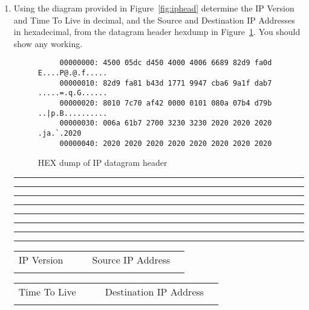\documentclass[a4paper,10pt]{article}
\begin{document}
\begin{enumerate}
\item Using the diagram provided in Figure~\ref{fig:iphead} determine
the IP Version and Time To Live in decimal, and the Source and Destination
IP Addresses in hexadecimal, from the datagram header hexdump in Figure~\ref{fig:iphex2}.
You should show any working.
\begin{figure}[h]
{\small
\begin{verbatim}
     00000000: 4500 05dc d450 4000 4006 6689 82d9 fa0d  E....P@.@.f.....
     00000010: 82d9 fa81 b43d 1771 9947 cba6 9a1f dab7  .....=.q.G......
     00000020: 8010 7c70 af42 0000 0101 080a 07b4 d79b  ..|p.B..........
     00000030: 006a 61b7 2700 3230 3230 2020 2020 2020  .ja.`.2020      
     00000040: 2020 2020 2020 2020 2020 2020 2020 2020  
\end{verbatim}
}
\caption{HEX dump of IP datagram header}
\label{fig:iphex2}
\end{figure}

\vspace{7mm}\hrule\vspace{7mm}\hrule\vspace{7mm}\hrule\vspace{7mm}\hrule
\vspace{7mm}\hrule\vspace{7mm}\hrule\vspace{7mm}\hrule\vspace{7mm}\hrule
\vspace{3mm}


\begin{tabular}{p{25mm}|l|lp{40mm}|l|}
\cline{2-2} \cline{5-5}
IP Version & \hspace{10mm} & \hspace{5mm} & Source IP Address & \hspace{30mm} \\
 & & & & \\
\cline{2-2} \cline{5-5}
\end{tabular}

\begin{tabular}{p{25mm}|l|lp{40mm}|l|}
\cline{2-2} \cline{5-5}
Time To Live & \hspace{10mm} & \hspace{5mm} & Destination IP Address & \hspace{30mm} \\
& & & & \\
\cline{2-2} \cline{5-5}
\end{tabular}


\end{enumerate}
\end{document}
